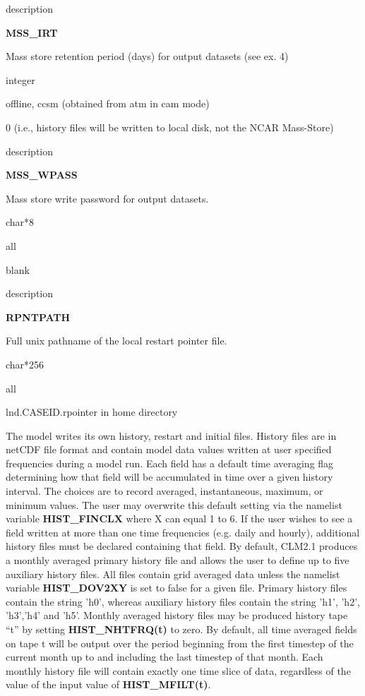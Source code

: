 \begin{Ventry}{description}
 \item[{\bf name}] {\bf MSS\_IRT}   
 \item[description] 
	Mass store retention period (days) for output datasets (see ex. 4) 
 \item[type] integer    
 \item[mode] offline, ccsm (obtained from atm in cam mode)  
 \item[default] 0 (i.e., history files will be written to local disk, 
	not the NCAR Mass-Store) 
\end{Ventry}
\medskip

\begin{Ventry}{description}
 \item[{\bf name}] {\bf MSS\_WPASS}   
 \item[description] 
	Mass store write password for output datasets.
 \item[type] char*8     
 \item[mode] all      
 \item[default] blank  
\end{Ventry}
\medskip

\begin{Ventry}{description}
 \item[{\bf name}] {\bf RPNTPATH}   
 \item[description] 
	Full unix pathname of the local restart pointer file. 
 \item[type] char*256              
 \item[mode] all       
 \item[default] lnd.CASEID.rpointer in home directory   
\end{Ventry}
\bigskip

The model writes its own history, restart and initial files. History
files are in netCDF file format and contain model data values written
at user specified frequencies during a model run.  Each field has a
default time averaging flag determining how that field will be
accumulated in time over a given history interval.  The choices are to
record averaged, instantaneous, maximum, or minimum values.  The user
may overwrite this default setting via the namelist variable {\bf
HIST\_FINCLX} where X can equal 1 to 6.  If the user wishes to see a
field written at more than one time frequencies (e.g. daily and
hourly), additional history files must be declared containing that
field.  By default, CLM2.1 produces a monthly averaged primary history
file and allows the user to define up to five auxiliary history files.
All files contain grid averaged data unless the namelist variable {\bf
HIST\_DOV2XY} is set to false for a given file.  Primary history files
contain the string 'h0', whereas auxiliary history files contain the
string 'h1', 'h2', 'h3','h4' and 'h5'.  Monthly averaged history files
may be produced history tape ``t'' by setting {\bf HIST\_NHTFRQ(t)}
to zero.  By default, all time averaged fields on tape t will be
output over the period beginning from the first timestep of the
current month up to and including the last timestep of that
month. Each monthly history file will contain exactly one time slice
of data, regardless of the value of the input value of {\bf
HIST\_MFILT(t)}.

